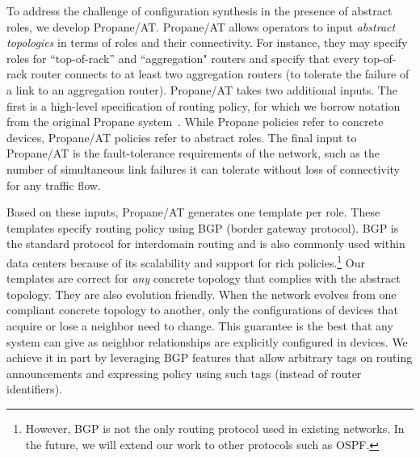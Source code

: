\documentclass[numbers, 10pt, preprint]{sigplanconf}
\newcommand{\sysname}{{\text{}\small \sf Propane/AT}\xspace}
\newcommand{\Propane}{{\text{}\small \sf Propane}\xspace}
\begin{document}
To address the challenge of configuration synthesis in the presence of abstract roles, we develop \sysname. 
\sysname
allows operators to input \emph{abstract topologies} in terms of roles
and their connectivity. For instance, they may specify roles for ``top-of-rack''
and ``aggregation" routers and specify that every top-of-rack router connects to
at least two aggregation routers (to tolerate the failure of a link to an
aggregation router). \sysname takes two additional inputs. 
The first is a  high-level specification of routing policy, for which we borrow notation from the original
\Propane system~\cite{propane}.  While \Propane policies refer to concrete devices,
\sysname policies refer to abstract roles.
The final input to \sysname is the fault-tolerance requirements of the network, such as the number of simultaneous link failures it can tolerate without loss of connectivity for any traffic flow. 


Based on these inputs, \sysname generates one template per role. 
These templates specify routing policy using BGP (border gateway protocol). 
BGP is the standard protocol for interdomain routing and is also commonly used within data centers because of its scalability and support for rich policies.\footnote{However, BGP is not the only routing protocol used in existing networks. In the future, we will extend our work to  other protocols such as OSPF.}
%
Our templates are correct for {\em any} concrete topology that complies with the abstract topology. They are also evolution friendly. 
When the network evolves from one compliant concrete topology to another, only the configurations of devices that acquire or lose a neighbor need to change. 
This guarantee is the best that any system can give as neighbor relationships are explicitly 
configured in devices.  We achieve it in part by leveraging BGP features that allow arbitrary tags on routing announcements and expressing policy using such tags (instead of router identifiers). 
\end{document}
